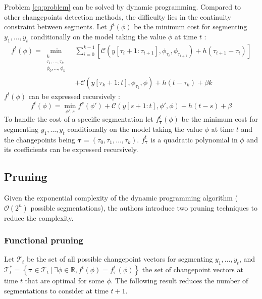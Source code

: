 \documentclass[11pt]{article}
\begin{document}
Problem \eqref{eq:problem} can be solved by dynamic programming. Compared to other changepoints detection methods, the difficulty lies in the continuity constraint between segments. Let $f^t(\phi)$ be the minimum cost for segmenting $y_1,\dots,y_t$ conditionally on the model taking the value $\phi$ at time $t$ :
\begin{equation}
    \begin{aligned}
        f^t(\phi)=\min_{\substack{k                                             \\\tau_1,\dots,\tau_{k}                         \\ \phi_0,\dots,\phi_k}} &\sum_{i=0}^{k-1} \left[\mathcal{C}(y[\tau_i+1:\tau_{i+1}],\phi_{\tau_i},\phi_{\tau_{i+1}}) + h(\tau_{i+1}-\tau_i)\right]\\
         & +\mathcal{C}(y[\tau_k+1:t],\phi_{\tau_k},\phi)+h(t-\tau_k) + \beta k
    \end{aligned}
\end{equation}
$f^t(\phi)$ can be expressed recursively :
\begin{equation}
    f^t(\phi)=\min_{\phi',s} f^s(\phi')+\mathcal{C}(y[s+1:t],\phi',\phi)+h(t-s)+\beta
\end{equation}
To handle the cost of a specific segmentation let $f^t_{\boldsymbol{\tau}}(\phi)$ be the minimum cost for segmenting $y_1,\dots,y_t$ conditionally on the model taking the value $\phi$ at time $t$ and the changepoints being $\boldsymbol{\tau}=(\tau_0,\tau_1,\dots,\tau_k)$. $f^t_{\boldsymbol{\tau}}$ is a quadratic polynomial in $\phi$ and its coefficients can be expressed recursively.

\subsection{Pruning}

Given the exponential complexity of the dynamic programming algorithm ($\mathcal{O}(2^n)$ possible segmentations), the authors introduce two pruning techniques to reduce the complexity.

\subsubsection{Functional pruning} Let $\mathcal{T}_t$ be the set of all possible changepoint vectors for segmenting $y_1,\dots,y_t$, and $\mathcal{T}_t^*=\left\{\boldsymbol{\tau}\in \mathcal{T}_t \:\big|\: \exists\phi\in\mathbb{R}, f^t(\phi)=f_{\boldsymbol{\tau}}^t(\phi)\right\}$ the set of changepoint vectors at time $t$ that are optimal for some $\phi$. The following result reduces the number of segmentations to consider at time $t+1$.
\end{document}
